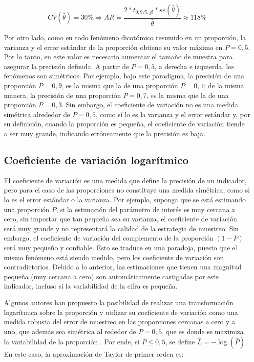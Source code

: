 \documentclass[
  12pt,
  spanish,
]{book}
\begin{document}
\[
CV(\hat\theta) = 30\% 
\Rightarrow 
AR = \frac{2*t_{0,975, gl} * se(\hat\theta)}{\hat\theta} \approx 118\%
\]

Por otro lado, como en todo fenómeno dicotómico resumido en un proporción, la varianza y el error estándar de la proporción obtiene su valor máximo en \(P=0,5\). Por lo tanto, en este valor es necesario aumentar el tamaño de muestra para asegurar la precisión definida. A partir de \(P=0,5\), a derecha e izquierda, los fenómenos son simétricos. Por ejemplo, bajo este paradigma, la precisión de una proporción \(P=0,9\), es la misma que la de una proporción \(P=0,1\); de la misma manera, la precisión de una proporción \(P=0,7\), es la misma que la de una proporción \(P=0,3\). Sin embargo, el coeficiente de variación no es una medida simétrica alrededor de \(P=0,5\), como sí lo es la varianza y el error estándar y, por su definición, cuando la proporción es pequeña, el coeficiente de variación tiende a ser muy grande, indicando erróneamente que la precisión es baja.

\hypertarget{coeficiente-de-variaciuxf3n-logaruxedtmico}{%
\subsection{Coeficiente de variación logarítmico}\label{coeficiente-de-variaciuxf3n-logaruxedtmico}}

El coeficiente de variación es una medida que define la precisión de un indicador, pero para el caso de las proporciones no constituye una medida simétrica, como sí lo es el error estándar o la varianza. Por ejemplo, suponga que se está estimando una proporción \(P\), si la estimación del parámetro de interés es muy cercana a cero, sin importar que tan pequeña sea su varianza, el coeficiente de variación será muy grande y no representará la calidad de la estrategia de muestreo. Sin embargo, el coeficiente de variación del complemento de la proporción \((1-P)\) será muy pequeño y confiable. Esto se traduce en una paradoja, puesto que el mismo fenómeno está siendo medido, pero los coeficiente de variación son contradictorios. Debido a lo anterior, las estimaciones que tienen una magnitud pequeña (muy cercana a cero) son automáticamente castigadas por este indicador, incluso si la variabilidad de la cifra es pequeña.

Algunos autores han propuesto la posibilidad de realizar una transformación logarítmica sobre la proporción y utilizar su coeficiente de variación como una medida robusta del error de muestreo en las proporciones cercanas a cero y a uno, que además sea simétrica al rededor de \(P=0,5\), que es donde se maximiza la variabilidad de la proporción \citep{Barnett_Walker_Chromy_Davis_Emrich_Odom_Packer_2003}. Por ende, si \(P\leq 0,5\), se define \(\hat L = -\log( \hat P)\). En este caso, la aproximación de Taylor de primer orden es:
\end{document}
